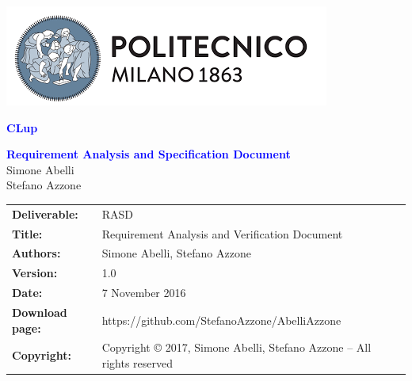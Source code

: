 
\usepackage[utf8]{inputenc}
\usepackage[dvipsnames]{xcolor}
\usepackage{listings}
\usepackage{alloy-style}



\begin{titlepage}



\centering
\includegraphics[scale=0.5]{Images/PolimiLogo}

\vspace{4cm}

{\textcolor{Blue}{\textbf{\Huge{CLup}}}} \\ [1cm]


\vspace{4cm}

{\textcolor{Blue}{\textbf{\Huge{Requirement Analysis and Specification
        Document}}}} \\ [1cm]

\vspace{4cm}
Simone Abelli \\
Stefano Azzone

\end{titlepage}

\begin{table}[h!]
\begin{tabu} to \textwidth { X[0.3,r,p] X[0.7,l,p] }
\hline

\textbf{Deliverable:} & RASD\\
\textbf{Title:} & Requirement Analysis and Verification Document \\
\textbf{Authors:} & Simone Abelli, Stefano Azzone \\
\textbf{Version:} & 1.0 \\ 
\textbf{Date:} & 7 November 2016 \\
\textbf{Download page:} & https://github.com/StefanoAzzone/AbelliAzzone \\
\textbf{Copyright:} & Copyright © 2017, Simone Abelli, Stefano Azzone – All rights reserved \\
\hline
\end{tabu}
\end{table}




